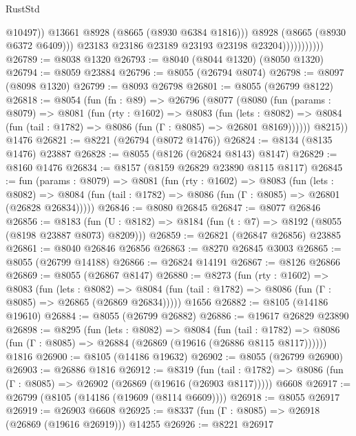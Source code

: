 \begin{lexlean}{RustStd}
\begin{coremodule}
                                  @10497))
                              @13661
                              @8928
                              (@8665 (@8930 @6384 @1816)))
                            @8928
                            (@8665 (@8930 @6372 @6409)))
                          @23183
                          @23186
                          @23189
                          @23193
                          @23198
                          @23204)))))))))))
@26789 := @8038 @1320
@26793 := @8040 (@8044 @1320) (@8050 @1320)
@26794 := @8059 @23884
@26796 := @8055 (@26794 @8074)
@26798 := @8097 (@8098 @1320)
@26799 := @8093 @26798
@26801 := @8055 (@26799 @8122)
@26818 := @8054
    (fun (fn : @89) =>
    @26796
      (@8077
        (@8080
          (fun (params : @8079) =>
          @8081
            (fun (rty : @1602) =>
            @8083
              (fun (lets : @8082) =>
              @8084 (fun (tail : @1782) => @8086 (fun (Γ : @8085) => @26801 @8169))))))
        @8215))
    @1476
@26821 := @8221 (@26794 (@8072 @1476))
@26824 := @8134 (@8135 @1476) @23887
@26828 := @8055 (@8126 (@26824 @8143) @8147)
@26829 := @8160 @1476
@26834 := @8157 (@8159 @26829 @23890 @8115 @8117)
@26845 := fun (params : @8079) =>
  @8081
    (fun (rty : @1602) =>
    @8083
      (fun (lets : @8082) =>
      @8084 (fun (tail : @1782) => @8086 (fun (Γ : @8085) => @26801 (@26828 @26834)))))
@26846 := @8080 @26845
@26847 := @8077 @26846
@26856 := @8183
    (fun (U : @8182) => @8184 (fun (t : @7) => @8192 (@8055 (@8198 @23887 @8073) @8209)))
@26859 := @26821 (@26847 @26856) @23885
@26861 := @8040 @26846 @26856
@26863 := @8270 @26845 @3003
@26865 := @8055 (@26799 @14188)
@26866 := @26824 @14191
@26867 := @8126 @26866
@26869 := @8055 (@26867 @8147)
@26880 := @8273
    (fun (rty : @1602) =>
    @8083
      (fun (lets : @8082) =>
      @8084 (fun (tail : @1782) => @8086 (fun (Γ : @8085) => @26865 (@26869 @26834)))))
    @1656
@26882 := @8105 (@14186 @19610)
@26884 := @8055 (@26799 @26882)
@26886 := @19617 @26829 @23890
@26898 := @8295
    (fun (lets : @8082) =>
    @8084
      (fun (tail : @1782) =>
      @8086 (fun (Γ : @8085) => @26884 (@26869 (@19616 (@26886 @8115 @8117))))))
    @1816
@26900 := @8105 (@14186 @19632)
@26902 := @8055 (@26799 @26900)
@26903 := @26886 @1816
@26912 := @8319
    (fun (tail : @1782) => @8086 (fun (Γ : @8085) => @26902 (@26869 (@19616 (@26903 @8117)))))
    @6608
@26917 := @26799 (@8105 (@14186 (@19609 (@8114 @6609))))
@26918 := @8055 @26917
@26919 := @26903 @6608
@26925 := @8337 (fun (Γ : @8085) => @26918 (@26869 (@19616 @26919))) @14255
@26926 := @8221 @26917

\end{coremodule}
\end{lexlean}
